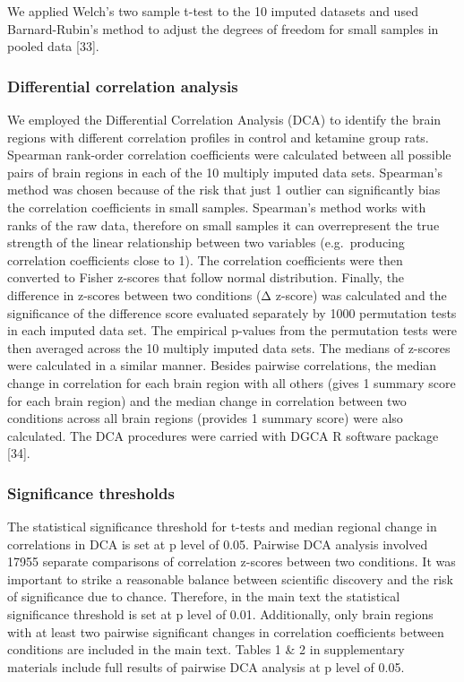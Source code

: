 \documentclass[man]{apa6}
\begin{document}
We applied Welch's two sample t-test to the 10 imputed datasets and used Barnard-Rubin's method to adjust the degrees of freedom for small samples in pooled data {[}33{]}.

\hypertarget{differential-correlation-analysis}{%
\subsubsection{Differential correlation analysis}\label{differential-correlation-analysis}}

We employed the Differential Correlation Analysis (DCA) to identify the brain regions with different correlation profiles in control and ketamine group rats. Spearman rank-order correlation coefficients were calculated between all possible pairs of brain regions in each of the 10 multiply imputed data sets. Spearman's method was chosen because of the risk that just 1 outlier can significantly bias the correlation coefficients in small samples. Spearman's method works with ranks of the raw data, therefore on small samples it can overrepresent the true strength of the linear relationship between two variables (e.g.~producing correlation coefficients close to 1). The correlation coefficients were then converted to Fisher z-scores that follow normal distribution. Finally, the difference in z-scores between two conditions (Δ z-score) was calculated and the significance of the difference score evaluated separately by 1000 permutation tests in each imputed data set. The empirical p-values from the permutation tests were then averaged across the 10 multiply imputed data sets. The medians of z-scores were calculated in a similar manner. Besides pairwise correlations, the median change in correlation for each brain region with all others (gives 1 summary score for each brain region) and the median change in correlation between two conditions across all brain regions (provides 1 summary score) were also calculated. The DCA procedures were carried with DGCA R software package {[}34{]}.

\hypertarget{significance-thresholds}{%
\subsubsection{Significance thresholds}\label{significance-thresholds}}

The statistical significance threshold for t-tests and median regional change in correlations in DCA is set at p level of 0.05. Pairwise DCA analysis involved 17955 separate comparisons of correlation z-scores between two conditions. It was important to strike a reasonable balance between scientific discovery and the risk of significance due to chance. Therefore, in the main text the statistical significance threshold is set at p level of 0.01. Additionally, only brain regions with at least two pairwise significant changes in correlation coefficients between conditions are included in the main text. Tables 1 \& 2 in supplementary materials include full results of pairwise DCA analysis at p level of 0.05.
\end{document}
